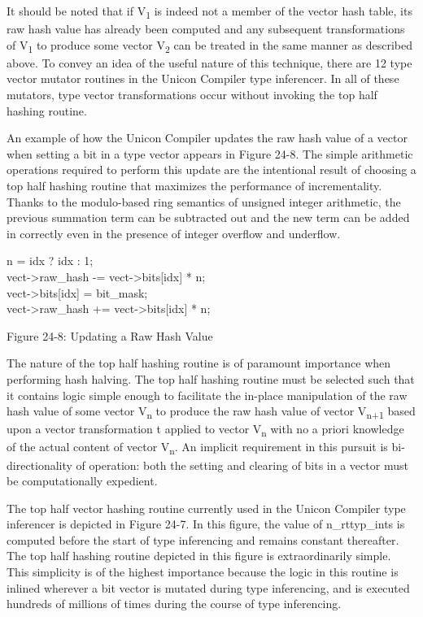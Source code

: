 {\bigskip

It should be noted that if V{\textsubscript{1}} is indeed not a member
of the vector hash table, its raw hash value has already been computed
and any subsequent transformations of V{\textsubscript{1}} to produce
some vector V{\textsubscript{2}} can be treated in the same manner as
described above. To convey an idea of the useful nature of this
technique, there are 12 type vector mutator routines in the Unicon
Compiler type inferencer. In all of these mutators, type vector
transformations occur without invoking the top half hashing routine.

An example of how the Unicon Compiler updates the raw hash value of a
vector when setting a bit in a type vector appears in Figure 24-8. The
simple arithmetic operations required to perform this update are the
intentional result of choosing a top half hashing routine that
maximizes the performance of incrementality. Thanks to the
modulo-based ring semantics of unsigned integer arithmetic, the
previous summation term can be subtracted out and the new term can be
added in correctly even in the presence of integer overflow and
underflow.

\begin{iconcode}
n = idx ? idx : 1; \\
vect-{\textgreater}raw\_hash -= vect-{\textgreater}bits[idx] * n; \\
vect-{\textgreater}bits[idx] {\textbar}= bit\_mask; \\
vect-{\textgreater}raw\_hash += vect-{\textgreater}bits[idx] * n;
\end{iconcode}
{\centering
Figure 24-8: Updating a Raw Hash Value
\par}

\bigskip

The nature of the top half hashing routine is of paramount importance
when performing hash halving. The top half hashing routine must be
selected such that it contains logic simple enough to facilitate the
in-place manipulation of the raw hash value of some vector
V{\textsubscript{n}} to produce the raw hash value of vector
V{\textsubscript{n+1}} based upon a vector transformation t applied to
vector V{\textsubscript{n}} with no a priori knowledge of the actual
content of vector V{\textsubscript{n}}. An implicit requirement in
this pursuit is bi-directionality of operation: both the setting and
clearing of bits in a vector must be computationally expedient.

The top half vector hashing routine currently used in the Unicon
Compiler type inferencer is depicted in Figure 24-7. In this figure, the
value of {\textsf{n\_rttyp\_ints}} is computed before the start of
type inferencing and remains constant thereafter. The top half hashing
routine depicted in this figure is extraordinarily simple. This
simplicity is of the highest importance because the logic in this
routine is inlined wherever a bit vector is mutated during type
inferencing, and is executed hundreds of millions of times during the
course of type inferencing.

}
